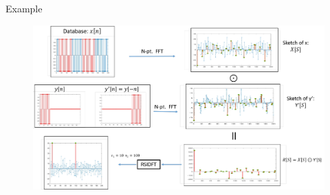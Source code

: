 \documentclass[10pt,xcolor=table]{beamer}
\def\fig_path{../Figures}
\begin{document}
\def\fracty{0.45}
\def\fractx{0.8}
\begin{frame}{Example}
	
	\begin{figure}[t]
		\centering
		\includegraphics[width=4.8in]{Example_full_framework}
	\end{figure}
	
\end{frame}
\end{document}
